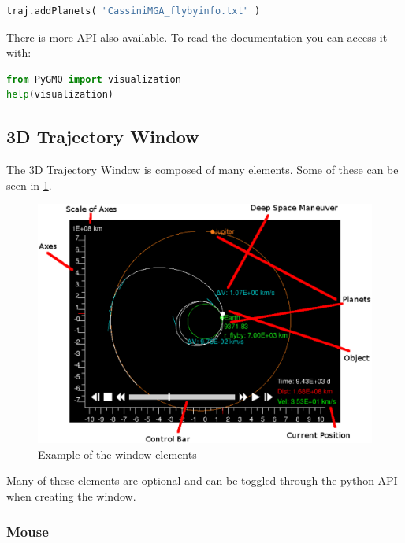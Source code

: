 \documentclass[a4paper,11pt]{article}
\begin{document}
\begin{lstlisting}[language=Python]
traj.addPlanets( "CassiniMGA_flybyinfo.txt" )
\end{lstlisting}

There is more \gls{API} also available. To read the documentation you can access it with:

\begin{lstlisting}[language=Python]
from PyGMO import visualization
help(visualization)
\end{lstlisting}




\subsection{3D Trajectory Window}\label{sec:window}

The 3D Trajectory Window is composed of many elements. Some of these can be seen in \ref{img:guide}.

\begin{figure}[h]
\centering
\includegraphics[width=1\textwidth]{img/guide}
\caption{Example of the window elements}
\label{img:guide}
\end{figure}

Many of these elements are optional and can be toggled through the python API when creating the window.

\subsubsection{Mouse}
\end{document}

